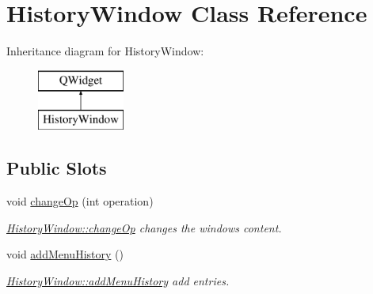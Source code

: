 \hypertarget{class_history_window}{}\section{History\+Window Class Reference}
\label{class_history_window}
Inheritance diagram for History\+Window\+:\begin{figure}[H]
\begin{center}
\leavevmode
\includegraphics[height=2.000000cm]{class_history_window}
\end{center}
\end{figure}
\subsection*{Public Slots}
\begin{DoxyCompactItemize}
\item 
void \hyperlink{class_history_window_aa1baf09cc1f8dfc65b3647ca783cef43}{change\+Op} (int operation)
\begin{DoxyCompactList}\small\item\em \hyperlink{class_history_window_aa1baf09cc1f8dfc65b3647ca783cef43}{History\+Window\+::change\+Op} changes the window\textquotesingle{}s content. \end{DoxyCompactList}\item 
\mbox{\label{class_history_window_a89fea4903efe8657ad735374255b317e}} 
void \hyperlink{class_history_window_a89fea4903efe8657ad735374255b317e}{add\+Menu\+History} ()
\begin{DoxyCompactList}\small\item\em \hyperlink{class_history_window_a89fea4903efe8657ad735374255b317e}{History\+Window\+::add\+Menu\+History} add entries. \end{DoxyCompactList}\end{DoxyCompactItemize}
